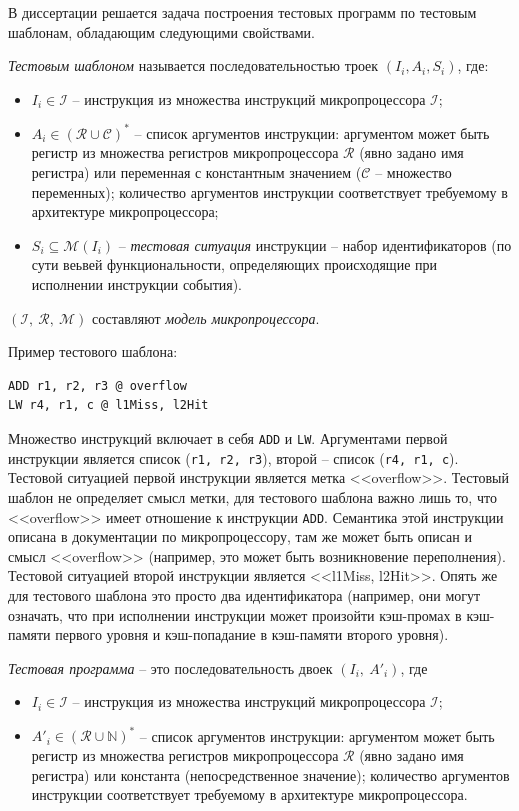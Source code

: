 В диссертации решается задача построения тестовых программ по
тестовым шаблонам, обладающим следующими свойствами.

\emph{Тестовым шаблоном} называется последовательностью троек $(I_i,
A_i, S_i)$, где:
\begin{itemize}
  \item $I_i \in \mathcal{I}$ -- инструкция из множества инструкций
микропроцессора $\mathcal{I}$;
  \item $A_i \in (\mathcal{R} \cup \mathcal{C})^*$ -- список аргументов
  инструкции: аргументом может быть регистр из множества регистров
  микропроцессора $\mathcal{R}$ (явно задано имя регистра) или
  переменная с константным значением ($\mathcal{C}$ -- множество
  переменных); количество аргументов инструкции соответствует
  требуемому в архитектуре микропроцессора;
  \item $S_i \subseteq \mathcal{M}(I_i)$ -- \emph{тестовая ситуация} инструкции -- набор идентификаторов (по сути веьвей функциональности, определяющих происходящие при исполнении инструкции события).
\end{itemize}

$(\mathcal{I},~\mathcal{R},~\mathcal{M})$ составляют \emph{модель микропроцессора}.

Пример тестового шаблона:
\begin{verbatim}
ADD r1, r2, r3 @ overflow
LW r4, r1, c @ l1Miss, l2Hit
\end{verbatim}
Множество инструкций включает в себя \texttt{ADD} и \texttt{LW}.
Аргументами первой инструкции является список (\texttt{r1, r2, r3}),
второй -- список (\texttt{r4, r1, c}). Тестовой ситуацией первой
инструкции является метка <<overflow>>. Тестовый шаблон не определяет смысл метки, для тестового шаблона важно лишь то, что <<overflow>> имеет отношение к инструкции \texttt{ADD}. Семантика этой инструкции описана в документации по микропроцессору, там же может быть описан и смысл <<overflow>> (например, это может быть возникновение переполнения).
Тестовой ситуацией второй инструкции является <<l1Miss, l2Hit>>. Опять же для тестового шаблона это просто два идентификатора (например, они могут означать, что при исполнении инструкции может произойти кэш-промах в кэш-памяти первого уровня и кэш-попадание в кэш-памяти второго уровня).

\emph{Тестовая программа} -- это последовательность двоек $(I_i,~A'_i)$, где
\begin{itemize}
  \item $I_i \in \mathcal{I}$ -- инструкция из множества инструкций
микропроцессора $\mathcal{I}$;
  \item $A'_i \in (\mathcal{R} \cup \mathds{N})^*$ -- список
  аргументов инструкции: аргументом может быть регистр из множества
  регистров микропроцессора $\mathcal{R}$ (явно задано имя регистра)
  или константа (непосредственное значение); количество аргументов
  инструкции соответствует требуемому в архитектуре микропроцессора.
\end{itemize}

